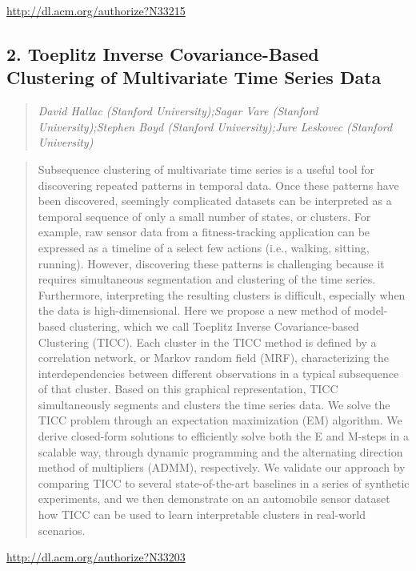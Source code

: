 \documentclass{article}
\begin{document}
\href{http://dl.acm.org/authorize?N33215}{http://dl.acm.org/authorize?N33215}

\subsection{2. Toeplitz Inverse Covariance-Based Clustering of Multivariate Time Series Data}

\begin{quote}
\footnotesize{\textit{David Hallac (Stanford University);Sagar Vare (Stanford University);Stephen Boyd (Stanford University);Jure Leskovec (Stanford University)}}

\end{quote}

\begin{quote}
Subsequence clustering of multivariate time series is a useful tool for discovering repeated patterns in temporal data. Once these patterns have been discovered, seemingly complicated datasets can be interpreted as a temporal sequence of only a small number of states, or clusters. For example, raw sensor data from a fitness-tracking application can be expressed as a timeline of a select few actions (i.e., walking, sitting, running). However, discovering these patterns is challenging because it requires simultaneous segmentation and clustering of the time series. Furthermore, interpreting the resulting clusters is difficult, especially when the data is high-dimensional. Here we propose a new method of model-based clustering, which we call Toeplitz Inverse Covariance-based Clustering (TICC). Each cluster in the TICC method is defined by a correlation network, or Markov random field (MRF), characterizing the interdependencies between different observations in a typical subsequence of that cluster. Based on this graphical representation, TICC simultaneously segments and clusters the time series data. We solve the TICC problem through an expectation maximization (EM) algorithm. We derive closed-form solutions to efficiently solve both the E and M-steps in a scalable way, through dynamic programming and the alternating direction method of multipliers (ADMM), respectively. We validate our approach by comparing TICC to several state-of-the-art baselines in a series of synthetic experiments, and we then demonstrate on an automobile sensor dataset how TICC can be used to learn interpretable clusters in real-world scenarios.
\end{quote}

\href{http://dl.acm.org/authorize?N33203}{http://dl.acm.org/authorize?N33203}
\end{document}

